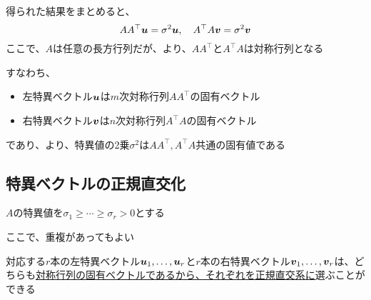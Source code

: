 \documentclass[../../../topic_linear-algebra]{subfiles}
\begin{document}
得られた結果をまとめると、
\begin{equation*}
  A A^\top \vb*{u} = \sigma^2 \vb*{u} , \quad A^\top A \vb*{v} = \sigma^2 \vb*{v}
\end{equation*}
ここで、$A$は任意の長方行列だが、より、$A A^\top$と$A^\top A$は対称行列となる

\br

すなわち、
\begin{itemize}
  \item 左特異ベクトル$\vb*{u}$は$m$次対称行列$A A^\top$の固有ベクトル
  \item 右特異ベクトル$\vb*{v}$は$n$次対称行列$A^\top A$の固有ベクトル
\end{itemize}
であり、より、特異値の2乗$\sigma^2$は$A A^\top, A^\top A$共通の固有値である

\subsection{特異ベクトルの正規直交化}

$A$の特異値を$\sigma_1 \geq \cdots \geq \sigma_r > 0$とする

ここで、重複があってもよい

\br

対応する$r$本の左特異ベクトル$\vb*{u}_1, \ldots, \vb*{u}_r$と$r$本の右特異ベクトル$\vb*{v}_1, \ldots, \vb*{v}_r$は、どちらも\hyperref[sec:orthogonalization-eigenvectors-symmetric]{対称行列の固有ベクトルであるから、それぞれを正規直交系に}選ぶことができる
\end{document}

